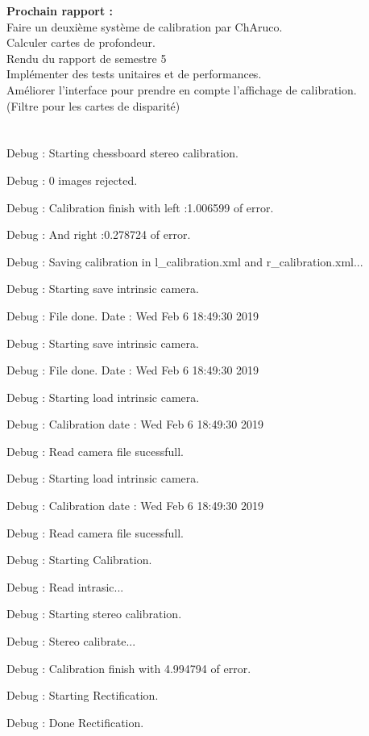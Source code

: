 \documentclass{article}
\begin{document}
\textbf{Prochain rapport :}\\
Faire un deuxième système de calibration par ChAruco.\\
Calculer cartes de profondeur.\\
Rendu du rapport de semestre 5\\
Implémenter des tests unitaires et de performances.\\
Améliorer l'interface pour prendre en compte l'affichage de calibration.\\
(Filtre pour les cartes de disparité)\\
\\\\



Debug :  Starting chessboard stereo calibration. 

Debug :  0 images rejected. 

Debug :  Calibration finish with left :1.006599 of error. 

Debug :  And right :0.278724 of error. 

Debug :  Saving calibration in l_calibration.xml and r_calibration.xml... 

Debug :  Starting save intrinsic camera. 

Debug :  File done. Date : Wed Feb  6 18:49:30 2019
 

Debug :  Starting save intrinsic camera. 

Debug :  File done. Date : Wed Feb  6 18:49:30 2019
 

Debug :  Starting load intrinsic camera. 

Debug :  Calibration date : Wed Feb  6 18:49:30 2019
 

Debug :  Read camera file sucessfull. 

Debug :  Starting load intrinsic camera. 

Debug :  Calibration date : Wed Feb  6 18:49:30 2019
 

Debug :  Read camera file sucessfull. 

Debug :  Starting Calibration. 

Debug :  Read intrasic... 

Debug :  Starting stereo calibration. 

Debug :  Stereo calibrate... 

Debug :  Calibration finish with 4.994794 of error. 

Debug :  Starting Rectification. 

Debug :  Done Rectification. 
\end{document}
